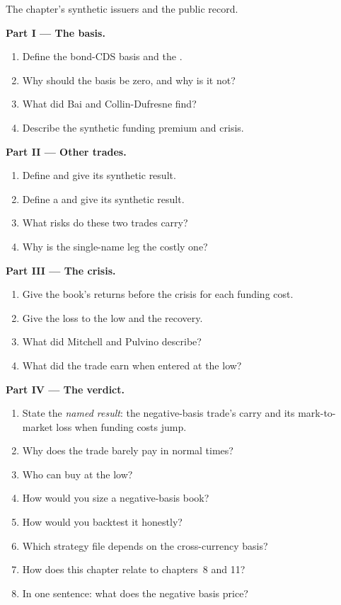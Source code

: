 \begin{problem}\label{pb:s2:credit-relative-value:1}
The chapter's synthetic issuers and the public record.

\medskip\noindent\textbf{Part I --- The basis.}
\begin{enumerate}
\item Define the bond-CDS basis and the .
\item Why should the basis be zero, and why is it not?
\item What did Bai and Collin-Dufresne find?
\item Describe the synthetic funding premium and crisis.
\end{enumerate}

\medskip\noindent\textbf{Part II --- Other trades.}
\begin{enumerate}[resume]
\item Define  and give its synthetic result.
\item Define a  and give its synthetic result.
\item What risks do these two trades carry?
\item Why is the single-name leg the costly one?
\end{enumerate}

\medskip\noindent\textbf{Part III --- The crisis.}
\begin{enumerate}[resume]
\item Give the book's returns before the crisis for each funding cost.
\item Give the loss to the low and the recovery.
\item What did Mitchell and Pulvino describe?
\item What did the trade earn when entered at the low?
\end{enumerate}

\medskip\noindent\textbf{Part IV --- The verdict.}
\begin{enumerate}[resume]
\item State the \emph{named result}: the negative-basis trade's carry and its mark-to-market loss when funding costs jump.
\item Why does the trade barely pay in normal times?
\item Who can buy at the low?
\item How would you size a negative-basis book?
\item How would you backtest it honestly?
\item Which strategy file depends on the cross-currency basis?
\item How does this chapter relate to chapters~8 and 11?
\item In one sentence: what does the negative basis price?
\end{enumerate}
\end{problem}


